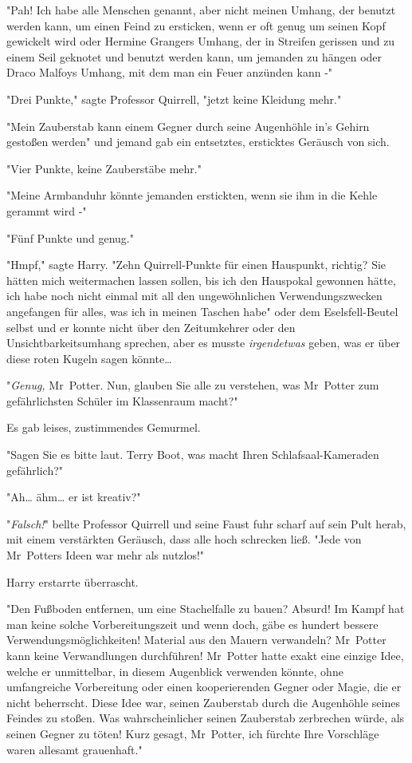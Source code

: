 {"Pah! Ich habe alle Menschen genannt, aber nicht meinen Umhang, der benutzt werden kann, um einen Feind zu ersticken, wenn er oft genug um seinen Kopf gewickelt wird oder Hermine Grangers Umhang, der in Streifen gerissen und zu einem Seil geknotet und benutzt werden kann, um jemanden zu hängen oder Draco Malfoys Umhang, mit dem man ein Feuer anzünden kann -"

"Drei Punkte," sagte Professor Quirrell, "jetzt keine Kleidung mehr."

"Mein Zauberstab kann einem Gegner durch seine Augenhöhle in's Gehirn gestoßen werden" und jemand gab ein entsetztes, ersticktes Geräusch von sich.

"Vier Punkte, keine Zauberstäbe mehr."

"Meine Armbanduhr könnte jemanden erstickten, wenn sie ihm in die Kehle gerammt wird -"

"Fünf Punkte und genug."

"Hmpf," sagte Harry. "Zehn Quirrell-Punkte für einen Hauspunkt, richtig? Sie hätten mich weitermachen lassen sollen, bis ich den Hauspokal gewonnen hätte, ich habe noch nicht einmal mit all den ungewöhnlichen Verwendungszwecken angefangen für alles, was ich in meinen Taschen habe" oder dem Eselsfell-Beutel selbst und er konnte nicht über den Zeitumkehrer oder den Unsichtbarkeitsumhang sprechen, aber es musste \emph{irgendetwas} geben, was er über diese roten Kugeln sagen könnte…

"\emph{Genug,} Mr~Potter. Nun, glauben Sie alle zu verstehen, was Mr~Potter zum gefährlichsten Schüler im Klassenraum macht?"

Es gab leises, zustimmendes Gemurmel.

"Sagen Sie es bitte laut. Terry Boot, was macht Ihren Schlafsaal-Kameraden gefährlich?"

"Ah… ähm… er ist kreativ?"

"\emph{Falsch!}" bellte Professor Quirrell und seine Faust fuhr scharf auf sein Pult herab, mit einem verstärkten Geräusch, dass alle hoch schrecken ließ. "Jede von Mr~Potters Ideen war mehr als nutzlos!"

Harry erstarrte überrascht.

"Den Fußboden entfernen, um eine Stachelfalle zu bauen? Absurd! Im Kampf hat man keine solche Vorbereitungszeit und wenn doch, gäbe es hundert bessere Verwendungsmöglichkeiten! Material aus den Mauern verwandeln? Mr~Potter kann keine Verwandlungen durchführen! Mr~Potter hatte exakt eine einzige Idee, welche er unmittelbar, in diesem Augenblick verwenden könnte, ohne umfangreiche Vorbereitung oder einen kooperierenden Gegner oder Magie, die er nicht beherrscht. Diese Idee war, seinen Zauberstab durch die Augenhöhle seines Feindes zu stoßen. Was wahrscheinlicher seinen Zauberstab zerbrechen würde, als seinen Gegner zu töten! Kurz gesagt, Mr~Potter, ich fürchte Ihre Vorschläge waren allesamt grauenhaft."

}
